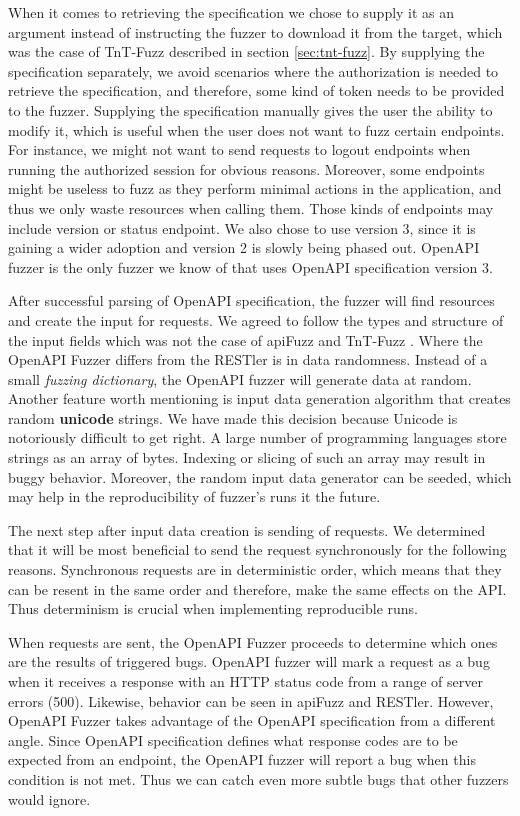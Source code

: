 When it comes to retrieving the specification we chose to supply it as an argument instead of instructing the fuzzer to download it from the target, which was the case of TnT-Fuzz described in section \ref{sec:tnt-fuzz}. By supplying the specification separately, we avoid scenarios where the authorization is needed to retrieve the specification, and therefore, some kind of token needs to be provided to the fuzzer. Supplying the specification manually gives the user the ability to modify it, which is useful when the user does not want to fuzz certain endpoints. For instance, we might not want to send requests to logout endpoints when running the authorized session for obvious reasons. Moreover, some endpoints might be useless to fuzz as they perform minimal actions in the application, and thus we only waste resources when calling them. Those kinds of endpoints may include version or status endpoint. We also chose to use version 3, since it is gaining a wider adoption and version 2 is slowly being phased out. OpenAPI fuzzer is the only fuzzer we know of that uses OpenAPI specification version 3.

After successful parsing of OpenAPI specification, the fuzzer will find resources and create the input for requests. We agreed to follow the types and structure of the input fields which was not the case of apiFuzz \cite{apiFuzz2020github} and TnT-Fuzz \cite{tntFuzzer2020github}. Where the OpenAPI Fuzzer differs from the RESTler \cite{atlidakis2019restler} is in data randomness. Instead of a small \textit{fuzzing dictionary}, the OpenAPI fuzzer will generate data at random. Another feature worth mentioning is input data generation algorithm that creates random \textbf{unicode} strings. We have made this decision because Unicode is notoriously difficult to get right. A large number of programming languages store strings as an array of bytes. Indexing or slicing of such an array may result in buggy behavior. Moreover, the random input data generator can be seeded, which may help in the reproducibility of fuzzer's runs it the future.

The next step after input data creation is sending of requests. We determined that it will be most beneficial to send the request synchronously for the following reasons. Synchronous requests are in deterministic order, which means that they can be resent in the same order and therefore, make the same effects on the API. Thus determinism is crucial when implementing reproducible runs.

When requests are sent, the OpenAPI Fuzzer proceeds to determine which ones are the results of triggered bugs. OpenAPI fuzzer will mark a request as a bug when it receives a response with an HTTP status code from a range of server errors (500). Likewise, behavior can be seen in apiFuzz and RESTler. However, OpenAPI Fuzzer takes advantage of the OpenAPI specification from a different angle. Since OpenAPI specification defines what response codes are to be expected from an endpoint, the OpenAPI fuzzer will report a bug when this condition is not met. Thus we can catch even more subtle bugs that other fuzzers would ignore.

